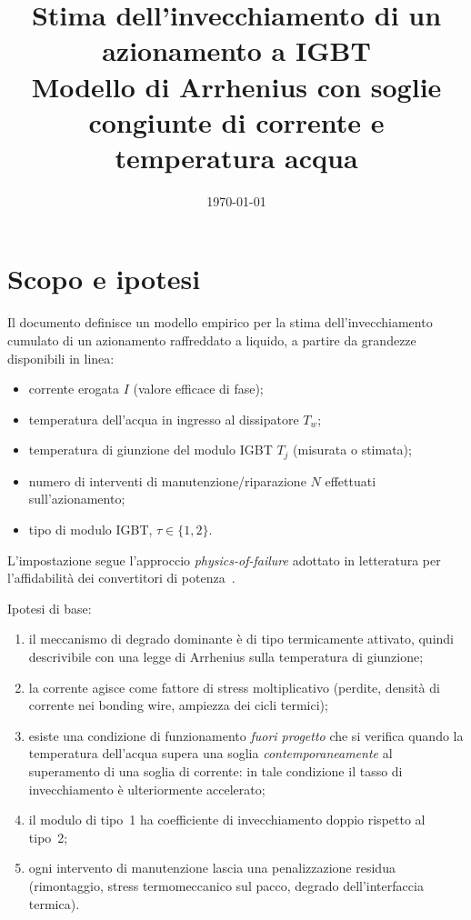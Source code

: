 \documentclass[11pt,a4paper]{article}
\title{Stima dell'invecchiamento di un azionamento a IGBT\\
\large Modello di Arrhenius con soglie congiunte di corrente e temperatura acqua}
\author{}
\date{\today}
\begin{document}
\maketitle

\section{Scopo e ipotesi}

Il documento definisce un modello empirico per la stima dell'invecchiamento
cumulato di un azionamento raffreddato a liquido, a partire da grandezze
disponibili in linea:

\begin{itemize}
  \item corrente erogata $I$ (valore efficace di fase);
  \item temperatura dell'acqua in ingresso al dissipatore $T_w$;
  \item temperatura di giunzione del modulo IGBT $T_j$ (misurata o stimata);
  \item numero di interventi di manutenzione/riparazione $N$ effettuati
        sull'azionamento;
  \item tipo di modulo IGBT, $\tau \in \{1,2\}$.
\end{itemize}

L'impostazione segue l'approccio \emph{physics-of-failure} adottato in
letteratura per l'affidabilità dei convertitori di
potenza~\cite{wang2013,ma2016,lutz2018}.

Ipotesi di base:

\begin{enumerate}
  \item il meccanismo di degrado dominante è di tipo termicamente attivato,
        quindi descrivibile con una legge di Arrhenius sulla temperatura di
        giunzione;
  \item la corrente agisce come fattore di stress moltiplicativo (perdite,
        densità di corrente nei bonding wire, ampiezza dei cicli termici);
  \item esiste una condizione di funzionamento \emph{fuori progetto} che si
        verifica quando la temperatura dell'acqua supera una soglia
        \emph{contemporaneamente} al superamento di una soglia di corrente:
        in tale condizione il tasso di invecchiamento è ulteriormente
        accelerato;
  \item il modulo di tipo~1 ha coefficiente di invecchiamento doppio rispetto
        al tipo~2;
  \item ogni intervento di manutenzione lascia una penalizzazione residua
        (rimontaggio, stress termomeccanico sul pacco, degrado dell'interfaccia
        termica).
\end{enumerate}
\end{document}
